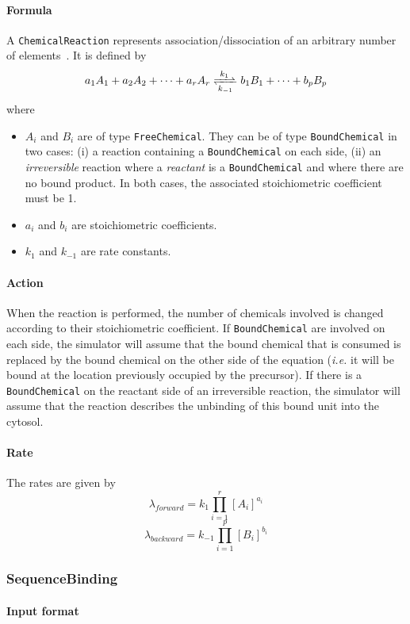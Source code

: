 \paragraph{Formula} A \texttt{ChemicalReaction} represents association/dissociation of an arbitrary number of elements~. It is defined by
\[
	\reactionRev{a_1 A_1 + a_2 A_2 + \cdots + a_r A_r}{b_1 B_1 + \cdots + b_p B_p}{k_1}{k_{-1}}
\]
where
\begin{itemize}
\item $A_i$ and $B_i$ are of type \texttt{FreeChemical}. They can be of type \texttt{BoundChemical} in two cases: (i) a reaction containing a \texttt{BoundChemical} on each side, (ii) an \emph{irreversible} reaction where a \emph{reactant} is a \texttt{BoundChemical} and where there are no bound product. In both cases, the associated stoichiometric coefficient must be 1.
\item $a_i$ and $b_i$ are stoichiometric coefficients.
\item $k_1$ and $k_{-1}$ are rate constants.
\end{itemize}

\paragraph{Action} When the reaction is performed, the number of chemicals involved is changed according to their stoichiometric coefficient. If \texttt{BoundChemical} are involved on each side, the simulator will assume that the bound chemical that is consumed is replaced by the bound chemical on the other side of the equation (\textit{i.e.} it will be bound at the location previously occupied by the precursor). If there is a \texttt{BoundChemical} on the reactant side of an irreversible reaction, the simulator will assume that the reaction describes the unbinding of this bound unit into the cytosol.

\paragraph{Rate} The rates are given by
\[
\lambda_{forward} = k_1 \prod\limits_{i=1}^{r} {[A_i]}^{a_i}
\]
\[
\lambda_{backward} = k_{-1} \prod\limits_{i=1}^{p} {[B_i]}^{b_i}
\]

\subsubsection{SequenceBinding}
\paragraph{Input format}

